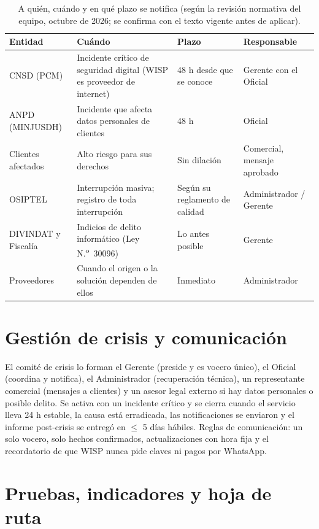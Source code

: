 \begin{table}[H]
\centering
\caption{A quién, cuándo y en qué plazo se notifica (según la revisión normativa del equipo, octubre de 2026; se confirma con el texto vigente antes de aplicar).}
\label{tab:anx-inc-notificacion}
\small
\begin{tabularx}{\textwidth}{L{2.4cm}XL{2.4cm}L{2.2cm}}
\toprule
\textbf{Entidad} & \textbf{Cuándo} & \textbf{Plazo} & \textbf{Responsable} \\
\midrule
CNSD (PCM) & Incidente crítico de seguridad digital (WISP es proveedor de internet) & 48 h desde que se conoce & Gerente con el Oficial \\
ANPD (MINJUSDH) & Incidente que afecta datos personales de clientes & 48 h & Oficial \\
Clientes afectados & Alto riesgo para sus derechos & Sin dilación & Comercial, mensaje aprobado \\
OSIPTEL & Interrupción masiva; registro de toda interrupción & Según su reglamento de calidad & Administrador / Gerente \\
DIVINDAT y Fiscalía & Indicios de delito informático (Ley N.\textsuperscript{o}~30096) & Lo antes posible & Gerente \\
Proveedores & Cuando el origen o la solución dependen de ellos & Inmediato & Administrador \\
\bottomrule
\end{tabularx}
\end{table}

\section{Gestión de crisis y comunicación}
El comité de crisis lo forman el Gerente (preside y es vocero único), el Oficial (coordina y
notifica), el Administrador (recuperación técnica), un representante comercial (mensajes a
clientes) y un asesor legal externo si hay datos personales o posible delito. Se activa con
un incidente crítico y se cierra cuando el servicio lleva 24 h estable, la causa está
erradicada, las notificaciones se enviaron y el informe post-crisis se entregó en $\leq$ 5
días hábiles. Reglas de comunicación: un solo vocero, solo hechos confirmados, actualizaciones
con hora fija y el recordatorio de que WISP nunca pide claves ni pagos por WhatsApp.

\section{Pruebas, indicadores y hoja de ruta}

